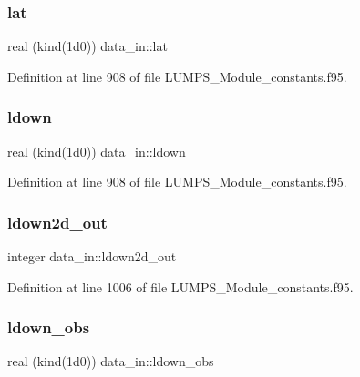\mbox{\label{namespacedata__in_a364ff1ce2a4c78ea431e4dacbd66d6b4}} 
\subsubsection{\texorpdfstring{lat}{lat}}
{\footnotesize\ttfamily real (kind(1d0)) data\+\_\+in\+::lat}



Definition at line 908 of file L\+U\+M\+P\+S\+\_\+\+Module\+\_\+constants.\+f95.

\mbox{\label{namespacedata__in_a7be43e97ab4efa32b57c8f6b6b5949b7}} 
\subsubsection{\texorpdfstring{ldown}{ldown}}
{\footnotesize\ttfamily real (kind(1d0)) data\+\_\+in\+::ldown}



Definition at line 908 of file L\+U\+M\+P\+S\+\_\+\+Module\+\_\+constants.\+f95.

\mbox{\label{namespacedata__in_a22e1d481d73a8409fc8c9df3ac03f209}} 
\subsubsection{\texorpdfstring{ldown2d\+\_\+out}{ldown2d\_out}}
{\footnotesize\ttfamily integer data\+\_\+in\+::ldown2d\+\_\+out}



Definition at line 1006 of file L\+U\+M\+P\+S\+\_\+\+Module\+\_\+constants.\+f95.

\mbox{\label{namespacedata__in_ad5a6e580db1d91b3cbb617a2bbee8d93}} 
\subsubsection{\texorpdfstring{ldown\+\_\+obs}{ldown\_obs}}
{\footnotesize\ttfamily real (kind(1d0)) data\+\_\+in\+::ldown\+\_\+obs}



